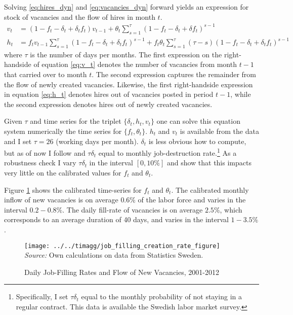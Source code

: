 Solving \eqref{eq:hires_dyn} and \eqref{eq:vacancies_dyn} forward yields an expression for stock of vacancies and the flow of hires in month $t$.
\begin{align}
v_t&=\left( 1-f_t-\delta_t+\delta_t f_t \right) v_{t-1} + \theta_t \sum_{s=1}^{\tau} \left( 1-f_t-\delta_t+\delta f_t \right)^{s-1}  \label{eq:v_t} \\
h_t&=f_t v_{t-1} \sum_{s=1}^{\tau} \left( 1-f_t-\delta_t+\delta_t f_t \right)^{s-1} + f_t \theta_t \sum_{s=1}^{\tau} \left( \tau- s\right) \left( 1-f_t-\delta_t+\delta_t f_t \right)^{s-1} \label{eq:h_t}
\end{align}
where $\tau$ is the number of days per months. The first expression on the right-handside of equation \eqref{eq:v_t} denotes the number of vacancies from month $t-1$ that carried over to month $t$. The second expression captures the remainder from the flow of newly created vacancies. Likewise, the first right-handside expression in equation \eqref{eq:h_t} denotes hires out of vacancies posted in period $t-1$, while the second expression denotes hires out of newly created vacancies. 

Given $\tau$ and time series for the triplet $\{\delta_t, h_t, v_t \}$ one can solve this equation system numerically the time series for $\{ f_t, \theta_t \}$. $h_t$ and $v_t$ is available from the data and I set $\tau=26$ (working days per month). $\delta_t$ is less obvious how to compute, but as of now I follow \cite{Davis2013} and $\tau \delta_t$ equal to monthly job-destruction rate.\footnote{Specifically, I set $\tau \delta_t$ equal to the monthly probability of not staying in a regular contract. This data is available the Swedish labor market survey.} As a robustness check I vary $\tau \delta_t$ in the interval $[0,10\%]$ and show that this impacts very little on the calibrated values for $f_t$ and $\theta_t$.

Figure \ref{fig:filling_rates} shows the calibrated time-series for $f_t$ and $\theta_t$. The calibrated monthly inflow of new vacancies is on average $0.6 \%$ of the labor force and varies in the interval $0.2-0.8 \%$. The daily fill-rate of vacancies is on average $2.5 \%$, which corresponds to an average duration of 40 days, and varies in the interval $1-3.5\%$. 

\begin{figure}[t]
\centering
\caption{Daily Job-Filling Rates and Flow of New Vacancies, 2001-2012}
\texttt{[image: ../../timagg/job\_filling\_creation\_rate\_figure]}
\flushleft
\footnotesize{\emph{Source:} Own calculations on data from Statistics Sweden.}
\label{fig:filling_rates}
\end{figure}

